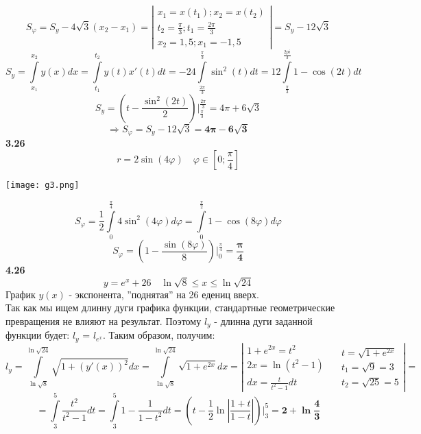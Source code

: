 \documentclass[14pt,a4paper]{scrartcl}
\theoremstyle{definition}
\theoremstyle{remark}
\theoremstyle{definition}
\theoremstyle{definition}
\begin{document}
$$
S_{ \varphi} = S_{y} - 4\sqrt{3}(x_2 - x_1) =
\left| \begin{gathered}
x_1 = x(t_1); x_2 = x(t_2)\\
t_2 = \frac{\pi}{3}; t_1 = \frac{2\pi}{3}\\
x_2 = 1,5; x_1 = -1,5
\end{gathered} \right|       = S_y - 12\sqrt{3}
$$
$$S_y  =  \int\limits_{x_1}^{x_2}{y(x)dx} =  \int\limits_{t_1}^{t_2}{y(t)x'(t)dt} =
 -24\int\limits_{ \frac{2\pi}{3} }^{ \frac{\pi}{3} }{\sin^2{(t)}dt } =
12  \int\limits_{ \frac{\pi}{3} }^{ \frac{2pi}{3} }{ 1 - \cos{(2t)} dt}
 $$
 $$
 S_y = \left( t - \frac{\sin^2{(2t)} }{2}  \right)\Big|_{ \frac{\pi}{3} }^{ \frac{2\pi}{3} } = 4\pi + 6\sqrt{3}
 $$
$$
\Rightarrow S_{\varphi} = S_y - 12\sqrt{3} = \mathbf{4\pi - 6\sqrt{3}}
$$
\textbf{3.26}
$$r = 2 \sin{(4\varphi)} \quad \varphi\in [0; \frac{\pi}{4} ] $$
\begin{center}
\texttt{[image: g3.png]}
\end{center}
$$
S_{\varphi} = \frac{1}{2}  \int\limits_{0}^{  \frac{\pi}{4} }{4 \sin^2{(4 \varphi)}d \varphi } =  \int\limits_{0}^{ \frac{\pi}{2} }{1 - \cos{(8\varphi)}d \varphi }
$$
$$
S_{\varphi} = \left( 1 -  \frac{\sin{(8 \varphi)}}{8}   \right)\Bigg|_{0}^{ \frac{\pi}{4} } = \mathbf{ \frac{\pi}{4} }
$$
\textbf{4.26}
$$
y = e^x + 26 \quad \ln{\sqrt{8}} \leq x \leq \ln{\sqrt{24}}
$$
График $y(x)$ - экспонента, ''поднятая'' на 26 едениц вверх.\\
Так как мы ищем длинну дуги графика функции, стандартные геометрические превращения не влияют на результат. Поэтому $l_y$ - длинна дуги заданной функции будет: $l_y$ = $l_{e^x}$.
Таким образом, получим: $$
l_y =  \int\limits_{\ln{\sqrt{8}}}^{\ln{\sqrt{24}}}{ \sqrt{1 + (y'(x))^2}dx} = \int\limits_{\ln{\sqrt{8}}}^{\ln{\sqrt{24}}}{ \sqrt{1 + e^{2x}}dx} = \left| \begin{gathered}
 1 + e^{2x} = t^2\\
2x = \ln{(t^2 -1)}\\
dx = \frac{t}{t^2 -1}dt
\end{gathered}
\quad
\begin{gathered}
  t = \sqrt{1+ e^{2x}}\\
  t_1 = \sqrt{9} = 3\\
  t_2 = \sqrt{25} = 5
\end{gathered}
 \right| =
$$
$$
= \int\limits_{3}^{5}{ \frac{t^2}{t^2 - 1} dt} =
 \int\limits_{3}^{5}{1 - \frac{1}{1-t^2}dt }=
 \left( t - \frac{1}{2}\ln{ \left| \frac{1+t}{1-t}  \right| }  \right)\Bigg|_{3}^5 = \mathbf{2 + \ln{ \frac{4}{3} }}
$$
\end{document}

